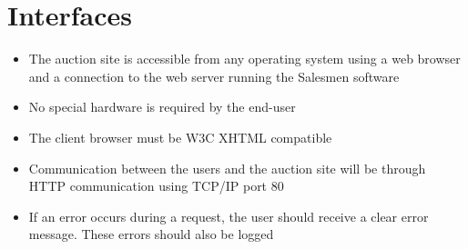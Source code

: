 \section{Interfaces}

	\begin{itemize}
		\item The auction site is accessible from any operating system using 
			a web browser and a connection to the web server running the
			Salesmen software
		\item No special hardware is required by the end-user
		\item The client browser must be W3C XHTML compatible
		\item Communication between the users and the auction site will be
			through HTTP communication using TCP/IP port 80
		\item If an error occurs during a request, the user should receive 
			a clear error message. These errors should also be logged			
	\end{itemize}
	
